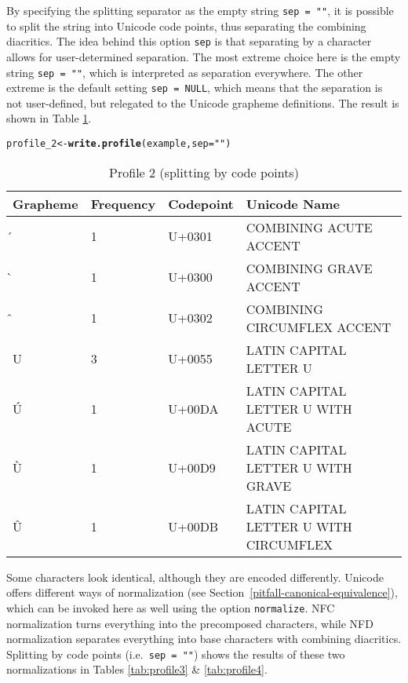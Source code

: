 \documentclass[output=book,nonflat,modfonts,
colorlinks, citecolor=brown,
		]{langsci/langscibook}\usepackage[]{graphicx}\usepackage[]{color}
\makeatletter
\newcommand{\hlstr}[1]{\textcolor[rgb]{0.192,0.494,0.8}{#1}}%
\newcommand{\hlstd}[1]{\textcolor[rgb]{0.345,0.345,0.345}{#1}}%
\newcommand{\hlkwb}[1]{\textcolor[rgb]{0.69,0.353,0.396}{#1}}%
\newcommand{\hlkwc}[1]{\textcolor[rgb]{0.333,0.667,0.333}{#1}}%
\newcommand{\hlkwd}[1]{\textcolor[rgb]{0.737,0.353,0.396}{\textbf{#1}}}%
\newenvironment{kframe}{%
 \def\at@end@of@kframe{}%
 \ifinner\ifhmode%
  \def\at@end@of@kframe{\end{minipage}}%
  \begin{minipage}{\columnwidth}%
 \fi\fi%
 \def\FrameCommand##1{\hskip\@totalleftmargin \hskip-\fboxsep
 \colorbox{shadecolor}{##1}\hskip-\fboxsep
     \hskip-\linewidth \hskip-\@totalleftmargin \hskip\columnwidth}%
 \MakeFramed {\advance\hsize-\width
   \@totalleftmargin\z@ \linewidth\hsize
   \@setminipage}}%
 {\par\unskip\endMakeFramed%
 \at@end@of@kframe}
\newenvironment{knitrout}{}{} %
\makeatother
\begin{document}
By specifying the splitting separator as the empty string
\texttt{sep~=~""}, it is possible to split the string into Unicode code points,
thus separating the combining diacritics. The idea behind this option
\texttt{sep} is that separating by a character allows for user-determined
separation. The most extreme choice here is the empty string \texttt{sep~=~""},
which is interpreted as separation everywhere. The other extreme is the default
setting \texttt{sep~=~NULL}, which means that the separation is not
user-defined, but relegated to the Unicode grapheme definitions. The result is 
shown in Table \ref{tab:profile2}.

\begin{knitrout}\footnotesize
{}\color{fgcolor}\begin{kframe}
\begin{alltt}
\hlstd{profile_2} \hlkwb{<-} \hlkwd{write.profile}\hlstd{(example,} \hlkwc{sep} \hlstd{=} \hlstr{""}\hlstd{)}
\end{alltt}
\end{kframe}
\end{knitrout}

\begin{table}[H]
\centering
\begingroup\scriptsize
\begin{tabular}{llll}
  \toprule
Grapheme & Frequency & Codepoint & Unicode Name \\ 
  \midrule
́ & 1 & U+0301 & COMBINING ACUTE ACCENT \\ 
  ̀ & 1 & U+0300 & COMBINING GRAVE ACCENT \\ 
  ̂ & 1 & U+0302 & COMBINING CIRCUMFLEX ACCENT \\ 
  U & 3 & U+0055 & LATIN CAPITAL LETTER U \\ 
  Ú & 1 & U+00DA & LATIN CAPITAL LETTER U WITH ACUTE \\ 
  Ù & 1 & U+00D9 & LATIN CAPITAL LETTER U WITH GRAVE \\ 
  Û & 1 & U+00DB & LATIN CAPITAL LETTER U WITH CIRCUMFLEX \\ 
   \bottomrule
\end{tabular}
\endgroup
\caption{Profile 2 (splitting by code points)} 
\label{tab:profile2}
\end{table}


Some characters look identical, although they are encoded differently.
Unicode offers different ways of normalization (see
Section~\ref{pitfall-canonical-equivalence}), which can be invoked here as well
using the option \texttt{normalize}. NFC normalization turns everything into the
precomposed characters, while NFD normalization separates everything into base
characters with combining diacritics. Splitting by code points (i.e.\ \texttt{sep~=~""}) 
shows the results of these two normalizations in Tables \ref{tab:profile3} \& \ref{tab:profile4}.
\end{document}
